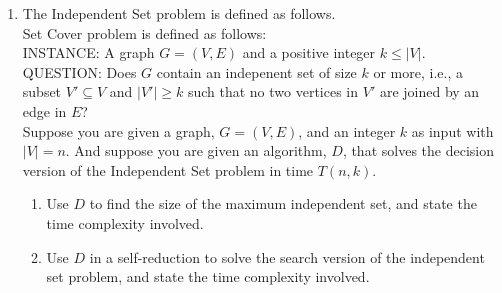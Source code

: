 \documentclass{article}%
\begin{document}
\begin{enumerate}
  \item The Independent Set problem is defined as follows.\\
  Set Cover problem is defined as follows:\\
  INSTANCE: A graph $G=(V,E)$ and a positive integer $k \leq |V|$.\\
  QUESTION: Does $G$ contain an indepenent set of size $k$ or more, i.e., a subset $V' \subseteq V$ and  $|V'| \geq k$ such that no two vertices in $V'$ are joined by an edge in $E$?\\
  Suppose you are given a graph, $G=(V,E)$, and an integer $k$ as input with $|V|=n$. And suppose you are given an algorithm, $D$, that solves the decision version of the Independent Set problem in time $T(n,k)$.
  	\begin {enumerate}
	\item Use $D$ to find the size of the maximum independent set, and state the time complexity involved.
	\item Use $D$ in a self-reduction to solve the search version of the independent set problem, and state the time complexity involved.  
	\end{enumerate}
	\end{enumerate}
\end{document}

